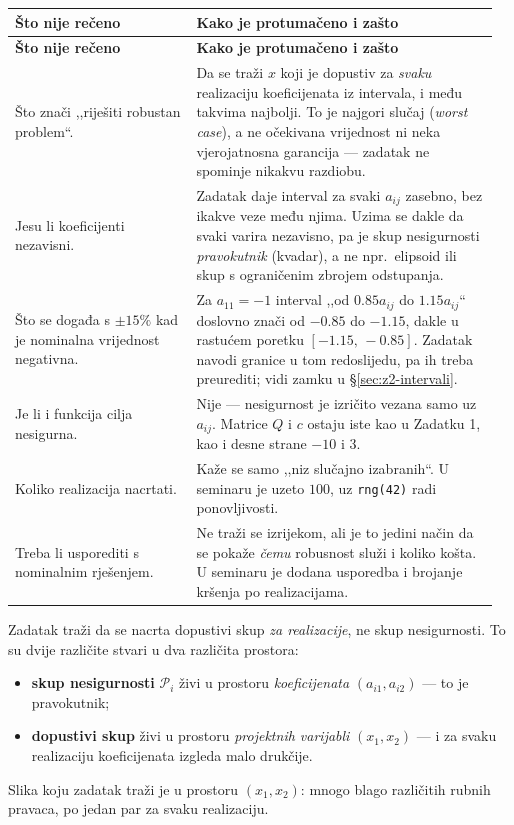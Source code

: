 \begin{longtable}{@{}p{0.36\linewidth} p{0.60\linewidth}@{}}
\toprule
\textbf{Što nije rečeno} & \textbf{Kako je protumačeno i zašto} \\
\midrule
\endfirsthead
\toprule
\textbf{Što nije rečeno} & \textbf{Kako je protumačeno i zašto} \\
\midrule
\endhead
Što znači ,,riješiti robustan problem``. & Da se traži $x$ koji je dopustiv za
\emph{svaku} realizaciju koeficijenata iz intervala, i među takvima najbolji. To
je najgori slučaj (\emph{worst case}), a ne očekivana vrijednost ni neka
vjerojatnosna garancija --- zadatak ne spominje nikakvu razdiobu. \\[6pt]
Jesu li koeficijenti nezavisni. & Zadatak daje interval za svaki $a_{ij}$
zasebno, bez ikakve veze među njima. Uzima se dakle da svaki varira nezavisno,
pa je skup nesigurnosti \emph{pravokutnik} (kvadar), a ne npr.\ elipsoid ili
skup s ograničenim zbrojem odstupanja. \\[6pt]
Što se događa s $\pm15\%$ kad je nominalna vrijednost negativna. & Za
$a_{11} = -1$ interval ,,od $0.85a_{ij}$ do $1.15a_{ij}$`` doslovno znači od
$-0.85$ do $-1.15$, dakle u rastućem poretku $[-1.15,\, -0.85]$. Zadatak
navodi granice u tom redoslijedu, pa ih treba preurediti; vidi
zamku u \S\ref{sec:z2-intervali}. \\[6pt]
Je li i funkcija cilja nesigurna. & Nije --- nesigurnost je izričito vezana samo
uz $a_{ij}$. Matrice $Q$ i $c$ ostaju iste kao u Zadatku 1, kao i desne strane
$-10$ i $3$. \\[6pt]
Koliko realizacija nacrtati. & Kaže se samo ,,niz slučajno izabranih``. U
seminaru je uzeto $100$, uz \texttt{rng(42)} radi ponovljivosti. \\[6pt]
Treba li usporediti s nominalnim rješenjem. & Ne traži se izrijekom, ali je to
jedini način da se pokaže \emph{čemu} robusnost služi i koliko košta. U seminaru
je dodana usporedba i brojanje kršenja po realizacijama. \\
\bottomrule
\end{longtable}

\begin{zamka}
Zadatak traži da se nacrta dopustivi skup \emph{za realizacije}, ne skup
nesigurnosti. To su dvije različite stvari u dva različita prostora:
\begin{itemize}[nosep,leftmargin=*]
  \item \textbf{skup nesigurnosti} $\mathcal{P}_i$ živi u prostoru
        \emph{koeficijenata} $(a_{i1}, a_{i2})$ --- to je pravokutnik;
  \item \textbf{dopustivi skup} živi u prostoru \emph{projektnih varijabli}
        $(x_1, x_2)$ --- i za svaku realizaciju koeficijenata izgleda malo
        drukčije.
\end{itemize}
Slika koju zadatak traži je u prostoru $(x_1, x_2)$: mnogo blago različitih
rubnih pravaca, po jedan par za svaku realizaciju.
\end{zamka}

